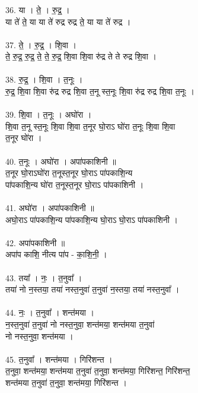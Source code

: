 \subsubsection{}
36. या । ते॒ । रु॒द्र॒ ।\\
या ते॑ ते॒ या या ते॑ रुद्र रुद्र ते॒ या या ते॑ रुद्र ।\\
\\
37. ते॒ । रु॒द्र॒ । शि॒वा ।\\
ते॒ रु॒द्र॒ रु॒द्र॒ ते॒ ते॒ रु॒द्र॒ शि॒वा शि॒वा रु॑द्र ते ते रुद्र शि॒वा ।\\
\\
38. रु॒द्र॒ । शि॒वा । त॒नूः ।\\
रु॒द्र॒ शि॒वा शि॒वा रु॑द्र रुद्र शि॒वा त॒नू स्त॒नूः शि॒वा रु॑द्र रुद्र शि॒वा त॒नूः ।\\
\\
39. शि॒वा । त॒नूः । अघो॑रा ।\\
शि॒वा त॒नू स्त॒नूः शि॒वा शि॒वा त॒नूर घो॒राऽ घो॑रा त॒नूः शि॒वा शि॒वा\\
त॒नूर घो॑रा ।\\
\\
40. त॒नूः । अघो॑रा । अपा॑पकाशिनी ॥\\
त॒नूर घो॒राऽघो॑रा त॒नूस्त॒नूर घो॒राऽ पा॑पकाशि॒न्य\\
पा॑पकाशि॒न्य घो॑रा त॒नूस्त॒नूर घो॒राऽ पा॑पकाशिनी ।\\
\\
41. अघो॑रा । अपा॑पकाशिनी ॥\\
अघो॒राऽ पा॑पकाशि॒न्य पा॑पकाशि॒न्य घो॒राऽ घो॒राऽ पा॑पकाशिनी ।\\
\\
42. अपा॑पकाशिनी ॥\\
अपा॑प काशि॒ नीत्य पा॑प - का॒शि॒नी॒ ।\\
\\
43. तया᳚ । नः॒ । त॒नुवा᳚ ।\\
तया॑ नो न॒स्तया॒ तया॑ नस्त॒नुवा॑ त॒नुवा॑ न॒स्तया॒ तया॑ नस्त॒नुवा᳚ ।\\
\\
44. नः॒ । त॒नुवा᳚ । शन्त॑मया ।\\
न॒स्त॒नुवा॑ त॒नुवा॑ नो नस्त॒नुवा॒ शन्त॑मया॒ शन्त॑मया त॒नुवा॑\\
नो नस्त॒नुवा॒ शन्त॑मया ।\\
\\
45. त॒नुवा᳚ । शन्त॑मया । गिरि॑शन्त ।\\
त॒नुवा॒ शन्त॑मया॒ शन्त॑मया त॒नुवा॑ त॒नुवा॒ शन्त॑मया॒ गिरि॑शन्त॒ गिरि॑शन्त॒\\
शन्त॑मया त॒नुवा॑ त॒नुवा॒ शन्त॑मया॒ गिरि॑शन्त ।\\
